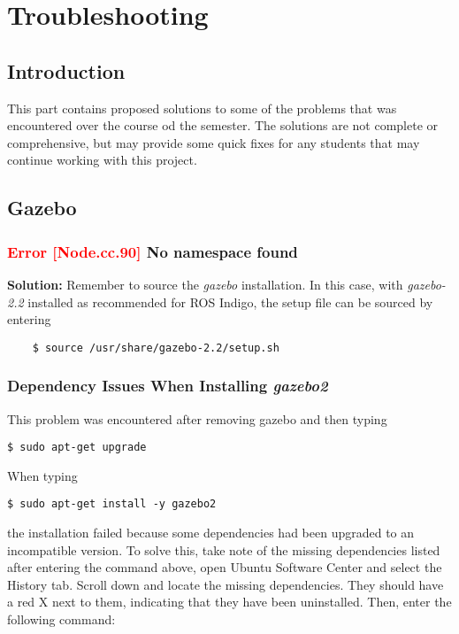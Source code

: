 \chapter{Troubleshooting}

\section{Introduction}

This part contains proposed solutions to some of the problems that was encountered over the course od the semester. The solutions are not complete or comprehensive, but may provide some quick fixes for any students that may continue working with this project.

\section{Gazebo}

\subsection{\textcolor{red}{Error [Node.cc.90]} No namespace found}

\textbf{Solution: } Remember to source the \textit{gazebo} installation. In this case, with \textit{gazebo-2.2} installed as recommended for \ac{ROS} Indigo, the setup file can be sourced by entering

\begin{verbatim}
	$ source /usr/share/gazebo-2.2/setup.sh
\end{verbatim}

\subsection{Dependency Issues When Installing \textit{gazebo2}}

This problem was encountered after removing gazebo and then typing

\begin{verbatim}
$ sudo apt-get upgrade
\end{verbatim}

When typing 

\begin{verbatim}
$ sudo apt-get install -y gazebo2
\end{verbatim}

the installation failed because some dependencies had been upgraded to an incompatible version. To solve this, take note of the missing dependencies listed after entering the command above, open Ubuntu Software Center and select the History tab. Scroll down and locate the missing dependencies. They should have a red X next to them, indicating that they have been uninstalled. Then, enter the following command:

